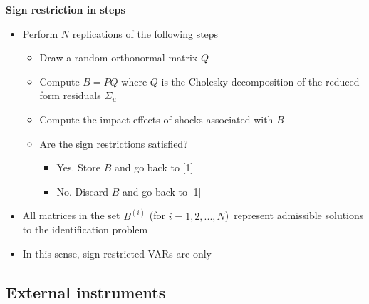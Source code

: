 
\begin{frame}
{\textbf{Sign restriction in steps}}\bigskip

\begin{itemize}
\item Perform $N$ replications of the following steps\smallskip

\begin{itemize}
\item[{[1]}] Draw a random orthonormal matrix $Q$\medskip

\item[{[2]}] Compute $B=PQ$ where $Q$ is the Cholesky decomposition of the
reduced form residuals $\Sigma _{u}$\medskip

\item[{[3]}] Compute the impact effects of shocks associated with $B$\medskip

\item[{[4]}] Are the sign restrictions satisfied?

\begin{itemize}
\item[{[4.1]}] Yes. Store $B$ and go back to {\footnotesize \color{title}[1]}
\medskip

\item[{[4.2]}] No. Discard $B$ and go back to {\footnotesize \color{title}[1]}%
\bigskip \pause
\end{itemize}
\end{itemize}

\item All matrices in the set $B^{(i)}$ (for $i=1,2,...,N$)\ represent
admissible solutions to the identification problem\bigskip

\item In this sense, sign restricted VARs are only {} 
\end{itemize}
\end{frame}


\subsection{External instruments}


